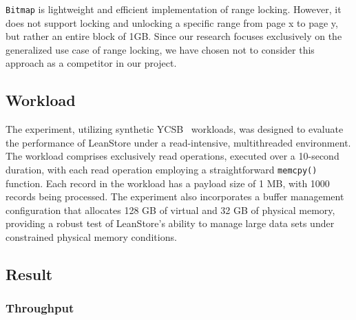 \texttt{Bitmap} is lightweight and efficient implementation of range locking.
However, it does not support locking and unlocking a specific range from page x to page y, but rather an entire block of 1GB. 
Since our research focuses exclusively on the generalized use case of range locking, we have chosen not to consider this approach as a competitor in our project.

\subsection{Workload}

The experiment, utilizing synthetic YCSB~\parencite{cooper2010benchmarking} workloads, was designed to evaluate the performance of LeanStore under a read-intensive, multithreaded environment. 
The workload comprises exclusively read operations, executed over a 10-second duration, with each read operation employing a straightforward \texttt{memcpy()} function. Each record in the workload has a payload size of 1 MB, with 1000 records being processed. 
The experiment also incorporates a buffer management configuration that allocates 128 GB of virtual and 32 GB of physical memory, providing a robust test of LeanStore's ability to manage large data sets under constrained physical memory conditions.

\subsection{Result}

\subsubsection*{Throughput}

